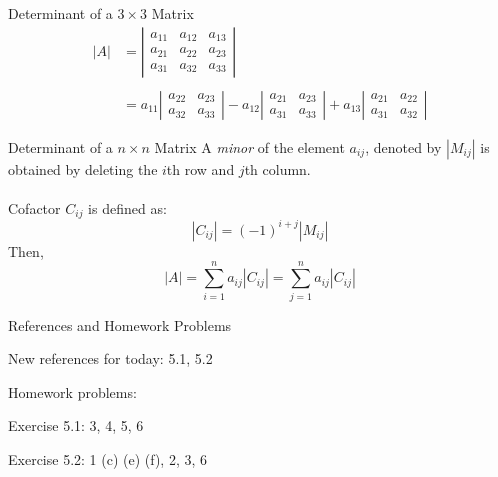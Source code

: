 \documentclass{./../../Latex/teaching_slides}
\begin{document}
 \begin{frame}{Determinant of a $3 \times 3$ Matrix}
$$
\begin{aligned}
|A| &=\left|\begin{array}{lll}
a_{11} & a_{12} & a_{13} \\
a_{21} & a_{22} & a_{23} \\
a_{31} & a_{32} & a_{33}
\end{array}\right| \\~\\
&=a_{11}\left|\begin{array}{ll}
a_{22} & a_{23} \\
a_{32} & a_{33}
\end{array}\right|-a_{12}\left|\begin{array}{ll}
a_{21} & a_{23} \\
a_{31} & a_{33}
\end{array}\right| 
+a_{13}\left|\begin{array}{ll}
a_{21} & a_{22} \\
a_{31} & a_{32}
\end{array}\right|
\end{aligned}
$$
 \end{frame}
 
 \begin{frame}{Determinant of a $n \times n$ Matrix}
A \textit{minor} of the element $a_{ij}$, denoted by $|M_{ij}|$ is obtained by deleting the $i$th row and $j$th column. \\~\\
Cofactor $C_{ij}$ is defined as:
$$ |C_{ij}| = (-1)^{i+j} |M_{ij}| $$
 Then, 
 $$|A| = \sum_{i=1}^n a_{ij} |C_{ij}| = \sum_{j=1}^n a_{ij} |C_{ij}| $$
 \end{frame}

 
\begin{frame}{References and Homework Problems}
\begin{witemize}
\item New references for today: 5.1, 5.2
\item Homework problems: \\
\begin{witemize}
\normalsize
\item Exercise 5.1: 3, 4, 5, 6
\item Exercise 5.2: 1 (c) (e) (f), 2, 3, 6
\end{witemize}

\end{witemize}
\end{frame}
\end{document}
